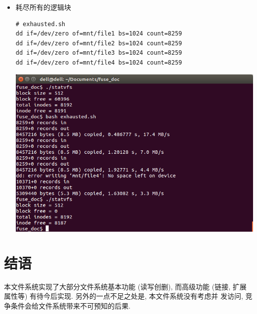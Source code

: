 \documentclass[nofonts, titlepage]{ctexart}
\begin{document}
\begin{itemize}
\item
  耗尽所有的逻辑块

\begin{verbatim}
# exhausted.sh
dd if=/dev/zero of=mnt/file1 bs=1024 count=8259
dd if=/dev/zero of=mnt/file2 bs=1024 count=8259
dd if=/dev/zero of=mnt/file3 bs=1024 count=8259
dd if=/dev/zero of=mnt/file4 bs=1024 count=8259  
\end{verbatim}

  \includegraphics[width=14cm]{./images/./exhausted_2.png}
\end{itemize}

\section{结语}
本文件系统实现了大部分文件系统基本功能 (读写创删), 而高级功能 (链接,
扩展属性等) 有待今后实现. 另外的一点不足之处是, 本文件系统没有考虑并
发访问, 竞争条件会给文件系统带来不可预知的后果.
\end{document}
